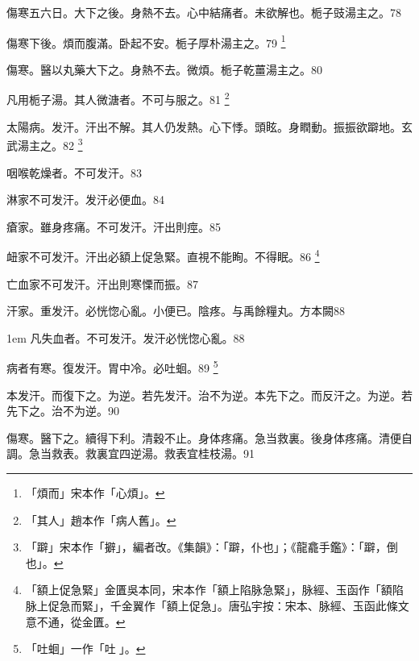 傷寒五六日。大下之後。身熱不去。心中結痛者。未欲解也。栀子{\khaaitp 豉}湯主之。78

傷寒下後。煩而腹滿。卧起不安。栀子厚朴湯主之。79
	\footnote{
		「煩而」宋本作「心煩」。
	}

傷寒。醫以丸藥大下之。身熱不去。微煩。栀子乾薑湯主之。80

凡用栀子湯。其人微溏者。不可与服之。81
	\footnote{
		「其人」趙本作「病人舊」。
	}

太陽病。发汗。汗出不解。其人仍发熱。心下悸。頭眩。身瞤動。振振欲躃地。玄武湯主之。82
	\footnote{
		「躃」宋本作「擗」，編者改。《集韻》：「躃，仆也」；《龍龕手鑑》：「躃，倒也」。
	}

咽喉乾燥者。不可发汗。83

淋家不可发汗。发汗必便血。84

瘡家。雖身疼痛。不可发汗。汗出則痙。85

衄家不可发汗。汗出必額上促急{\khaaitp 緊}。直視不能眴。不得眠。86
	\footnote{
		「額上促急緊」金匱吳本同，宋本作「額上陷脉急緊」，脉經、玉函作「額陷脉上促急而緊」，千金翼作「額上促急」。唐弘宇按：宋本、脉經、玉函此條文意不通，從金匱。
	}

亡血家不可发汗。汗出則寒慄而振。87

汗家。重发汗。必恍惚心亂。小便已。陰疼。与禹餘糧丸。{\scriptsize 方本闕}88

\hangindent 1em
凡失血者。不可发汗。发汗必恍惚心亂。{\gaoben}88

病者有寒。復发汗。胃中冷。必吐蛔。89
	\footnote{
		「吐蛔」一作「吐{\sungtpii 𠱘}」。
	}

本发汗。而復下之。为逆。若先发汗。治不为逆。本先下之。而反汗之。为逆。若先下之。治不为逆。90

傷寒。醫下之。續得下利。清穀不止。身体疼痛。急当救裏。後身体疼痛。清便自調。急当救表。救裏宜四逆湯。救表宜桂枝湯。91

